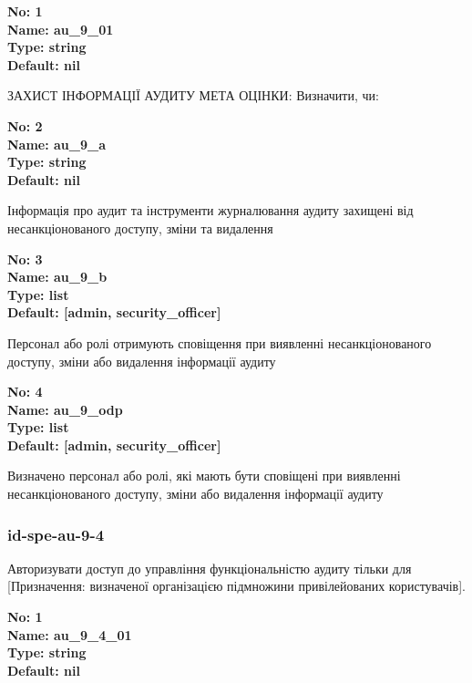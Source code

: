\documentclass{article}
\begin{document}
\vspace{10pt}
{\footnotesize\bfseries
No: 1\\
Name: au\_\allowbreak{}9\_\allowbreak{}01\\
Type: string\\
Default: nil
}

{\footnotesize ЗАХИСТ ІНФОРМАЦІЇ АУДИТУ МЕТА ОЦІНКИ: Визначити, чи:}


{\footnotesize\bfseries
No: 2\\
Name: au\_\allowbreak{}9\_\allowbreak{}a\\
Type: string\\
Default: nil
}

{\footnotesize Інформація про аудит та інструменти журналювання аудиту захищені від несанкціонованого доступу, зміни та видалення}


{\footnotesize\bfseries
No: 3\\
Name: au\_\allowbreak{}9\_\allowbreak{}b\\
Type: list\\
Default: [\textquotedbl{}admin\textquotedbl{}, \textquotedbl{}security\_\allowbreak{}officer\textquotedbl{}]
}

{\footnotesize Персонал або ролі отримують сповіщення при виявленні несанкціонованого доступу, зміни або видалення інформації аудиту}


{\footnotesize\bfseries
No: 4\\
Name: au\_\allowbreak{}9\_\allowbreak{}odp\\
Type: list\\
Default: [\textquotedbl{}admin\textquotedbl{}, \textquotedbl{}security\_\allowbreak{}officer\textquotedbl{}]
}

{\footnotesize Визначено персонал або ролі, які мають бути сповіщені при виявленні несанкціонованого доступу, зміни або видалення інформації аудиту}




\subsubsection{id-spe-au-9-4}
Авторизувати доступ до управління функціональністю аудиту тільки для [Призначення: визначеної організацією підмножини привілейованих користувачів].

\vspace{10pt}
{\footnotesize\bfseries
No: 1\\
Name: au\_\allowbreak{}9\_\allowbreak{}4\_\allowbreak{}01\\
Type: string\\
Default: nil
}
\end{document}
